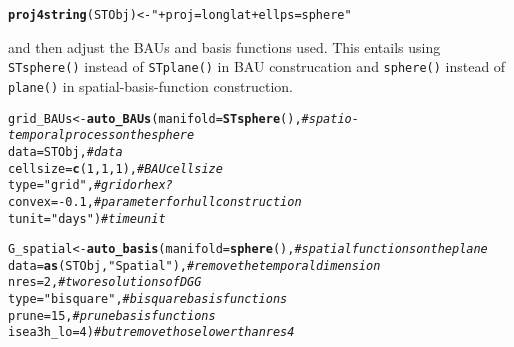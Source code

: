 \documentclass{article}\usepackage[]{graphicx}\usepackage[]{color}
\makeatletter
\newcommand{\hlnum}[1]{\textcolor[rgb]{0.686,0.059,0.569}{#1}}%
\newcommand{\hlstr}[1]{\textcolor[rgb]{0.192,0.494,0.8}{#1}}%
\newcommand{\hlcom}[1]{\textcolor[rgb]{0.678,0.584,0.686}{\textit{#1}}}%
\newcommand{\hlopt}[1]{\textcolor[rgb]{0,0,0}{#1}}%
\newcommand{\hlstd}[1]{\textcolor[rgb]{0.345,0.345,0.345}{#1}}%
\newcommand{\hlkwb}[1]{\textcolor[rgb]{0.69,0.353,0.396}{#1}}%
\newcommand{\hlkwc}[1]{\textcolor[rgb]{0.333,0.667,0.333}{#1}}%
\newcommand{\hlkwd}[1]{\textcolor[rgb]{0.737,0.353,0.396}{\textbf{#1}}}%
\newenvironment{kframe}{%
 \def\at@end@of@kframe{}%
 \ifinner\ifhmode%
  \def\at@end@of@kframe{\end{minipage}}%
  \begin{minipage}{\columnwidth}%
 \fi\fi%
 \def\FrameCommand##1{\hskip\@totalleftmargin \hskip-\fboxsep
 \colorbox{shadecolor}{##1}\hskip-\fboxsep
     \hskip-\linewidth \hskip-\@totalleftmargin \hskip\columnwidth}%
 \MakeFramed {\advance\hsize-\width
   \@totalleftmargin\z@ \linewidth\hsize
   \@setminipage}}%
 {\par\unskip\endMakeFramed%
 \at@end@of@kframe}
\newenvironment{knitrout}{}{} %
\renewcommand{\tt} {\texttt}
\makeatother
\begin{document}
\begin{knitrout}
\color{fgcolor}\begin{kframe}
\begin{alltt}
\hlkwd{proj4string}\hlstd{(STObj)} \hlkwb{<-} \hlstr{"+proj=longlat +ellps=sphere"}
\end{alltt}
\end{kframe}
\end{knitrout}

\noindent  and then adjust the BAUs and basis functions used. This entails using \tt{STsphere()} instead of \tt{STplane()} in BAU construcation and \tt{sphere()} instead of \tt{plane()} in spatial-basis-function construction.



\begin{knitrout}
\color{fgcolor}\begin{kframe}
\begin{alltt}
\hlstd{grid_BAUs} \hlkwb{<-} \hlkwd{auto_BAUs}\hlstd{(}\hlkwc{manifold}\hlstd{=}\hlkwd{STsphere}\hlstd{(),}       \hlcom{# spatio-temporal process on the sphere}
                       \hlkwc{data}\hlstd{=STObj,}                \hlcom{# data}
                       \hlkwc{cellsize} \hlstd{=} \hlkwd{c}\hlstd{(}\hlnum{1}\hlstd{,}\hlnum{1}\hlstd{,}\hlnum{1}\hlstd{),}       \hlcom{# BAU cell size}
                       \hlkwc{type}\hlstd{=}\hlstr{"grid"}\hlstd{,}               \hlcom{# grid or hex?}
                       \hlkwc{convex}\hlstd{=}\hlopt{-}\hlnum{0.1}\hlstd{,}               \hlcom{# parameter for hull construction}
                       \hlkwc{tunit}\hlstd{=}\hlstr{"days"}\hlstd{)}              \hlcom{# time unit}

 \hlstd{G_spatial} \hlkwb{<-} \hlkwd{auto_basis}\hlstd{(}\hlkwc{manifold} \hlstd{=} \hlkwd{sphere}\hlstd{(),}      \hlcom{# spatial functions on the plane}
                        \hlkwc{data}\hlstd{=}\hlkwd{as}\hlstd{(STObj,}\hlstr{"Spatial"}\hlstd{),}  \hlcom{# remove the temporal dimension}
                        \hlkwc{nres} \hlstd{=} \hlnum{2}\hlstd{,}                  \hlcom{# two resolutions of DGG}
                        \hlkwc{type} \hlstd{=} \hlstr{"bisquare"}\hlstd{,}         \hlcom{# bisquare basis functions}
                        \hlkwc{prune}\hlstd{=}\hlnum{15}\hlstd{,}                  \hlcom{# prune basis functions}
                        \hlkwc{isea3h_lo} \hlstd{=} \hlnum{4}\hlstd{)}             \hlcom{# but remove those lower than res 4}
\end{alltt}
\end{kframe}
\end{knitrout}
\end{document}
